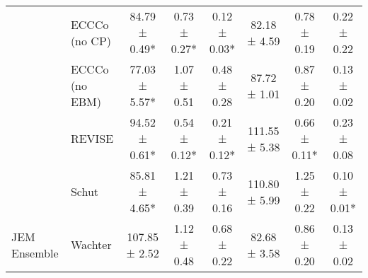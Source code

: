 \begin{table*}
{\begin{tabular}[t]{llcccccc}
 & ECCCo (no CP) & 84.79 ± 0.49* & 0.73 ± 0.27* & 0.12 ± 0.03* & 82.18 ± 4.59 & 0.78 ± 0.19 & 0.22 ± 0.22\\

 & ECCCo (no EBM) & 77.03 ± 5.57* & 1.07 ± 0.51 & 0.48 ± 0.28 & 87.72 ± 1.01 & 0.87 ± 0.20 & 0.13 ± 0.02\\

 & REVISE & 94.52 ± 0.61* & 0.54 ± 0.12* & 0.21 ± 0.12* & 111.55 ± 5.38 & 0.66 ± 0.11* & 0.23 ± 0.08\\

 & Schut & 85.81 ± 4.65* & 1.21 ± 0.39 & 0.73 ± 0.16 & 110.80 ± 5.99 & 1.25 ± 0.22 & 0.10 ± 0.01*\\

\multirow{-7}{*}{\raggedright\arraybackslash JEM Ensemble} & Wachter & 107.85 ± 2.52 & 1.12 ± 0.48 & 0.68 ± 0.22 & 82.68 ± 3.58 & 0.86 ± 0.20 & 0.13 ± 0.02\\
\bottomrule
\end{tabular}}
\end{table*}
